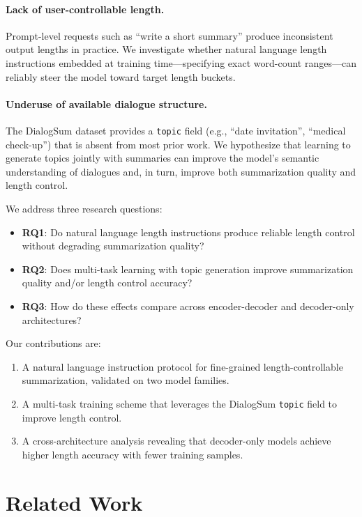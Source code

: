 \documentclass[11pt,a4paper]{article}
\begin{document}
\paragraph{Lack of user-controllable length.}
Prompt-level requests such as ``write a short summary'' produce inconsistent output lengths in practice.
We investigate whether natural language length instructions embedded at training time---specifying exact word-count ranges---can reliably steer the model toward target length buckets.

\paragraph{Underuse of available dialogue structure.}
The DialogSum dataset provides a \texttt{topic} field (e.g., ``date invitation'', ``medical check-up'') that is absent from most prior work.
We hypothesize that learning to generate topics jointly with summaries can improve the model's semantic understanding of dialogues and, in turn, improve both summarization quality and length control.

We address three research questions:
\begin{itemize}[nosep]
  \item \textbf{RQ1}: Do natural language length instructions produce reliable length control without degrading summarization quality?
  \item \textbf{RQ2}: Does multi-task learning with topic generation improve summarization quality and/or length control accuracy?
  \item \textbf{RQ3}: How do these effects compare across encoder-decoder and decoder-only architectures?
\end{itemize}

Our contributions are:
\begin{enumerate}[nosep]
  \item A natural language instruction protocol for fine-grained length-controllable summarization, validated on two model families.
  \item A multi-task training scheme that leverages the DialogSum \texttt{topic} field to improve length control.
  \item A cross-architecture analysis revealing that decoder-only models achieve higher length accuracy with fewer training samples.
\end{enumerate}

\section{Related Work}
\end{document}
